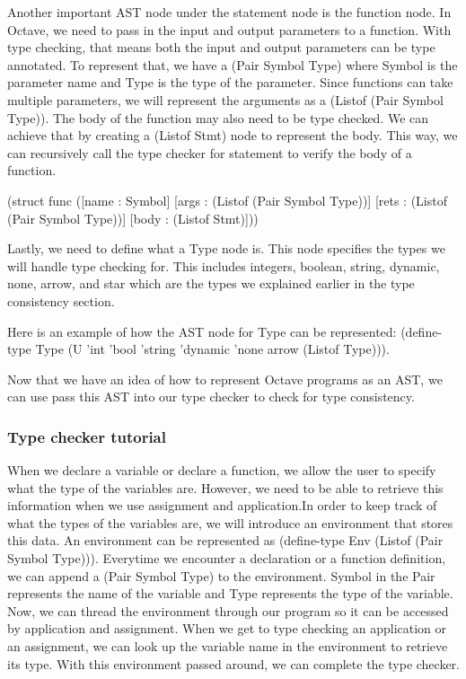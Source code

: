 Another important AST node under the statement node is the function node. In Octave, we need to pass in the input and output parameters to a function. With type checking, that means both the input and output parameters can be type annotated. To represent that, we have a (Pair Symbol Type) where Symbol is the parameter name and Type is the type of the parameter. Since functions can take multiple parameters, we will represent the arguments as a (Listof (Pair Symbol Type)). The body of the function may also need to be type checked. We can achieve that by creating a (Listof Stmt) node to represent the body. This way, we can recursively call the type checker for statement to verify the body of a function.

(struct func
  ([name : Symbol]
   [args : (Listof (Pair Symbol Type))]
   [rets : (Listof (Pair Symbol Type))]
   [body : (Listof Stmt)]))

Lastly, we need to define what a Type node is. This node specifies the types we will handle type checking for. This includes integers, boolean, string, dynamic, none, arrow, and star which are the types we explained earlier in the type consistency section. 

Here is an example of how the AST node for Type can be represented:
(define-type Type
  (U 'int 'bool 'string 'dynamic 'none arrow (Listof Type))).

Now that we have an idea of how to represent Octave programs as an AST, we can use pass this AST into our type checker to check for type consistency. 

\subsubsection{Type checker tutorial}
When we declare a variable or declare a function, we allow the user to specify what the type of the variables are. However, we need to be able to retrieve this information when we use assignment and application.In order to keep track of what the types of the variables are, we will introduce an environment that stores this data. An environment can be represented as (define-type Env (Listof (Pair Symbol Type))). Everytime we encounter a declaration or a function definition, we can append a (Pair Symbol Type) to the environment. 
Symbol in the Pair represents the name of the variable and Type represents the type of the variable. Now, we can thread the environment through our program so it can be accessed by application and assignment. When we get to type checking an application or an assignment, we can look up the variable name in the environment to retrieve its type. With this environment passed around, we can complete the type checker. 

